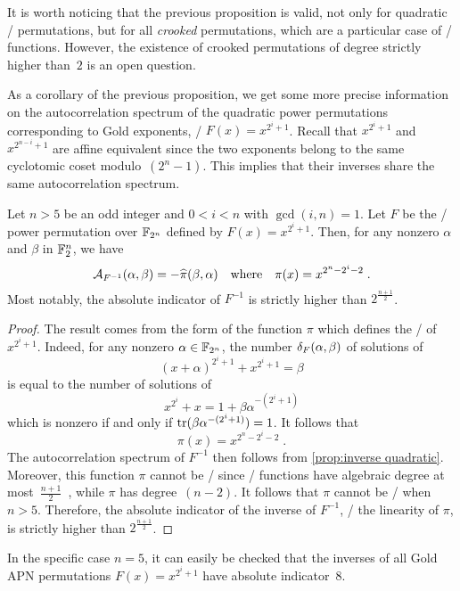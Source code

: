 It is worth noticing that the previous proposition is valid, not only for quadratic \APN/ permutations, but for all \emph{crooked} permutations, which are a particular case of \AB/ functions.
However, the existence of crooked permutations of degree strictly higher than~$2$ is an open question.

As a corollary of the previous proposition, we get some more precise information on the autocorrelation spectrum of the quadratic power permutations corresponding to Gold exponents, \ie/ $F(x)=x^{2^i+1}$.
Recall that $x^{2^i+1}$ and $x^{2^{n-i}+1}$ are affine equivalent since the two exponents belong to the same cyclotomic coset modulo~$(2^n-1)$.
This implies that their inverses share the same autocorrelation spectrum.

\begin{corollary}
    Let $n > 5$ be an odd integer and $0 < i < n$ with $\gcd(i,n)=1$.
    Let $F$ be  the \APN/ power permutation over $\mathbb{F}_{2^n}$ defined by $F(x)=x^{2^i+1}$.
    Then, for any nonzero $\alpha$ and $\beta$ in $\mathbb{F}_2^n$, we have
    \begin{equation*}
        \mathcal{A}_{F^{-1}}(\alpha, \beta) = -\widehat{\pi}(\beta, \alpha) \quad \text{where} \quad \pi(x) = x^{2^n-2^i-2}\;.
    \end{equation*}
    Most notably, the absolute indicator of $F^{-1}$ is strictly higher than $2^{\frac{n+1}{2}}$.
\end{corollary}
\begin{proof}
    The result comes from the form of the function $\pi$ which defines the \DDT/ of $x^{2^i+1}$.
    Indeed, for any nonzero $\alpha \in \mathbb{F}_{2^n}$, the number $\delta_{F}(\alpha, \beta)$ of solutions of
    \begin{equation*}
        (x + \alpha)^{2^i+1} + x^{2^i+1} = \beta
    \end{equation*}
    is equal to the number of solutions of
    \begin{equation*}
        x^{2^i} + x = 1 + \beta \alpha^{-(2^i+1)}
    \end{equation*}
    which is nonzero if and only if $\operatorname{tr}(\beta\alpha^{-(2^i+1)})=1$.
    It follows that
    \begin{equation*}
        \pi(x) = x^{2^n-2^i-2}\;.
    \end{equation*}
    The autocorrelation spectrum of $F^{-1}$ then follows from \cref{prop:inverse quadratic}.
    Moreover, this function $\pi$ cannot be \AB/ since \AB/ functions have algebraic degree at most~$\frac{n+1}{2}$~\cite[Theorem~1]{DCC:CarChaZin98}, while $\pi$ has degree~$(n-2)$.
    It follows that $\pi$ cannot be \AB/ when $n > 5$.
    Therefore, the absolute indicator of the inverse of $F^{-1}$, \ie/ the linearity of $\pi$, is strictly higher than $2^{\frac{n+1}{2}}$.
\end{proof}
In the specific case $n=5$, it can easily be checked that the inverses of all Gold APN permutations $F(x)=x^{2^i+1}$ have absolute indicator~$8$.


